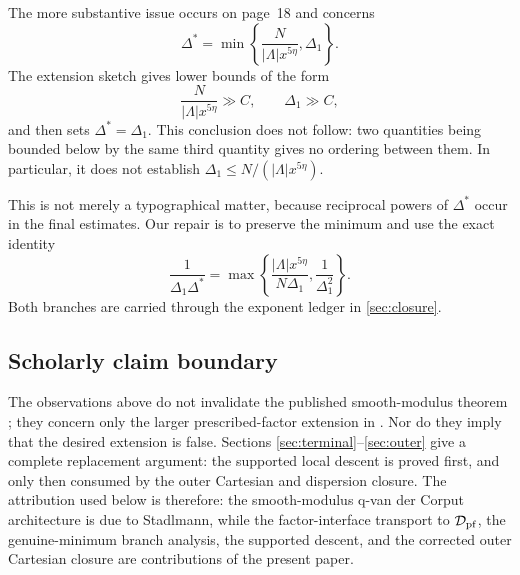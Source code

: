The more substantive issue occurs on page~18 and concerns
\begin{equation}\label{eq:delta-star-diagnosis}
 \Delta^*=\min\left\{
 \frac{N}{|\Lambda|x^{5\eta}},\Delta_1\right\}.
\end{equation}
The extension sketch gives lower bounds of the form
\[
 \frac{N}{|\Lambda|x^{5\eta}}\gg C,
 \qquad \Delta_1\gg C,
\]
and then sets $\Delta^*=\Delta_1$.  This conclusion does not follow: two
quantities being bounded below by the same third quantity gives no ordering
between them.  In particular, it does not establish
$\Delta_1\le N/(|\Lambda|x^{5\eta})$.

This is not merely a typographical matter, because reciprocal powers of
$\Delta^*$ occur in the final estimates.  Our repair is to preserve the
minimum and use the exact identity
\begin{equation}\label{eq:delta-branch-diagnosis}
 \frac1{\Delta_1\Delta^*}
 =\max\left\{
 \frac{|\Lambda|x^{5\eta}}{N\Delta_1},
 \frac1{\Delta_1^2}
 \right\}.
\end{equation}
Both branches are carried through the exponent ledger in
\cref{sec:closure}.

\subsection{Scholarly claim boundary}

The observations above do not invalidate the published smooth-modulus theorem
\cite{Stadlmann2025}; they concern only the larger prescribed-factor
extension in \cite{Stadlmann2026}.  Nor do they imply that the desired
extension is false.  Sections \ref{sec:terminal}--\ref{sec:outer} give a
complete replacement argument: the supported local descent is proved first,
and only then consumed by the outer Cartesian and dispersion closure.  The
attribution used below is therefore: the smooth-modulus q-van der Corput
architecture is due to Stadlmann, while the factor-interface transport to
$\mathcal D_{\mathrm{pf}}$, the genuine-minimum branch analysis, the supported descent, and the
corrected outer Cartesian closure are contributions of the present paper.
